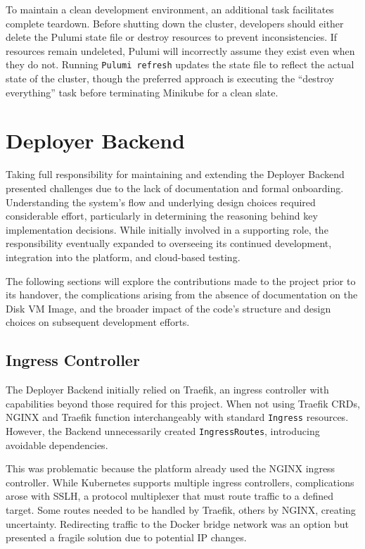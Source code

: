 To maintain a clean development environment, an additional task facilitates complete teardown. Before shutting down the cluster, developers should either delete the Pulumi state file or destroy resources to prevent inconsistencies. If resources remain undeleted, Pulumi will incorrectly assume they exist even when they do not. Running \texttt{Pulumi refresh} updates the state file to reflect the actual state of the cluster, though the preferred approach is executing the ``destroy everything'' task before terminating Minikube for a clean slate.

\section{Deployer Backend}
Taking full responsibility for maintaining and extending the Deployer Backend presented challenges due to the lack of documentation and formal onboarding. Understanding the system's flow and underlying design choices required considerable effort, particularly in determining the reasoning behind key implementation decisions. While initially involved in a supporting role, the responsibility eventually expanded to overseeing its continued development, integration into the platform, and cloud-based testing.

The following sections will explore the contributions made to the project prior to its handover, the complications arising from the absence of documentation on the Disk VM Image, and the broader impact of the code's structure and design choices on subsequent development efforts.

\subsection{Ingress Controller}
The Deployer Backend initially relied on Traefik, an ingress controller with capabilities beyond those required for this project. When not using Traefik CRDs, NGINX and Traefik function interchangeably with standard \texttt{Ingress} resources. However, the Backend unnecessarily created \texttt{IngressRoutes}, introducing avoidable dependencies.

This was problematic because the platform already used the NGINX ingress controller. While Kubernetes supports multiple ingress controllers, complications arose with SSLH, a protocol multiplexer that must route traffic to a defined target. Some routes needed to be handled by Traefik, others by NGINX, creating uncertainty. Redirecting traffic to the Docker bridge network was an option but presented a fragile solution due to potential IP changes.

